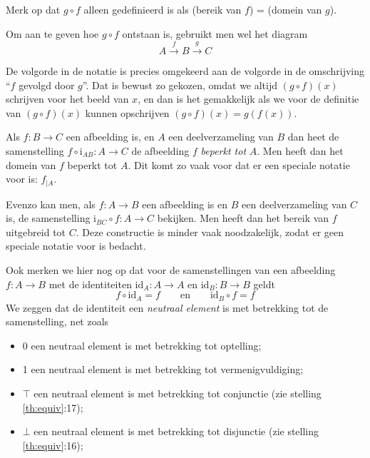 Merk op dat $g\circ f$ alleen gedefinieerd is als (bereik van $f$) = (domein van $g$).

Om aan te geven hoe $g\circ f$ ontstaan is, gebruikt men wel het diagram
$$A\overset{f}{\rightarrow}B\overset{g}{\rightarrow}C$$

De volgorde in de notatie is precies omgekeerd aan de volgorde in de omschrijving ``$f$ gevolgd door $g$''. Dat is bewust zo gekozen, omdat we altijd $(g\circ f)(x)$ schrijven voor het beeld van $x$, en dan is het gemakkelijk als we voor de definitie van $(g\circ f)(x)$ kunnen opschrijven $(g\circ f)(x)=g(f(x))$.

Als $f:B\rightarrow C$  een afbeelding is, en $A$ een deelverzameling van $B$ dan heet de samenstelling $f\circ \text{i}_{AB}:A\rightarrow C$ de afbeelding $f$ \textit{beperkt tot} $A$. Men heeft dan het domein van $f$ beperkt tot $A$. Dit komt zo vaak voor dat er een speciale notatie voor is: $f_{|A}$.

Evenzo kan men, als $f:A\rightarrow B$ een afbeelding is en $B$ een deelverzameling van $C$ is, de samenstelling $\text{i}_{BC}\circ f:A\rightarrow C$ bekijken. Men heeft dan het bereik van $f$ uitgebreid tot $C$. Deze constructie is minder vaak noodzakelijk, zodat er geen speciale notatie voor is bedacht.

Ook merken we hier nog op dat voor de samenstellingen van een afbeelding $f:A\rightarrow B$ met de identiteiten $\text{id}_A:A\rightarrow A$ en $\text{id}_B:B\rightarrow B$ geldt
$$f\circ\text{id}_A=f\qquad\text{en}\qquad\text{id}_B\circ f=f$$
We zeggen dat de identiteit een \textit{neutraal element} is met betrekking tot de samenstelling, net zoals
\begin{itemize}
    \item 0 een neutraal element is met betrekking tot optelling;
    \item 1 een neutraal element is met betrekking tot vermenigvuldiging;
    \item $\top$ een neutraal element is met betrekking tot conjunctie (zie stelling \ref{th:equiv}:17);
    \item $\bot$ een neutraal element is met betrekking tot disjunctie (zie stelling \ref{th:equiv}:16);
\end{itemize}

